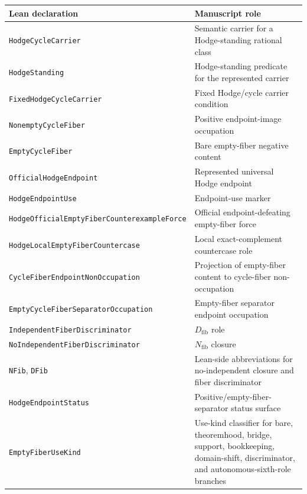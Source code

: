 \documentclass[11pt]{article}
\begin{document}
{\scriptsize
\begin{longtable}{p{}p{}}
\toprule Lean declaration & Manuscript role\\ \midrule\endhead
\texttt{HodgeCycleCarrier} & Semantic carrier for a Hodge-standing rational class\\
\texttt{HodgeStanding} & Hodge-standing predicate for the represented carrier\\
\texttt{FixedHodgeCycleCarrier} & Fixed Hodge/cycle carrier condition\\
\texttt{NonemptyCycleFiber} & Positive endpoint-image occupation\\
\texttt{EmptyCycleFiber} & Bare empty-fiber negative content\\
\texttt{OfficialHodgeEndpoint} & Represented universal Hodge endpoint\\
\texttt{HodgeEndpointUse} & Endpoint-use marker\\
\texttt{HodgeOfficialEmptyFiberCounterexampleForce} & Official endpoint-defeating empty-fiber force\\
\texttt{HodgeLocalEmptyFiberCountercase} & Local exact-complement countercase role\\
\texttt{CycleFiberEndpointNonOccupation} & Projection of empty-fiber content to cycle-fiber non-occupation\\
\texttt{EmptyCycleFiberSeparatorOccupation} & Empty-fiber separator endpoint occupation\\
\texttt{IndependentFiberDiscriminator} & $D_{\mathrm{fib}}$ role\\
\texttt{NoIndependentFiberDiscriminator} & $N_{\mathrm{fib}}$ closure\\
\texttt{NFib}, \texttt{DFib} & Lean-side abbreviations for no-independent closure and fiber discriminator\\
\texttt{HodgeEndpointStatus} & Positive/empty-fiber-separator status surface\\
\texttt{EmptyFiberUseKind} & Use-kind classifier for bare, theoremhood, bridge, support, bookkeeping, domain-shift, discriminator, and autonomous-sixth-role branches\\
\bottomrule
\end{longtable}
}
\end{document}
